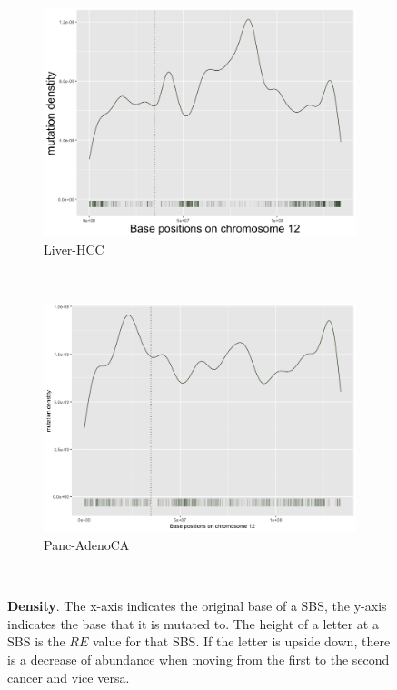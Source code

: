 \begin{figure}
\begin{subfigure}{.5\textwidth}
    \includegraphics[width=\linewidth,height=0.7\textwidth]{graphics/mutdistribution_Liver-HCC.png}
    \caption{Liver-HCC}
    \label{fig:density_liver}
    \end{subfigure}
    ~
    \begin{subfigure}{.5\textwidth}
    
    \includegraphics[width=\linewidth,height=0.7\textwidth]{graphics/mutdistribution_Panc-AdenoCA.png}
    \caption{Panc-AdenoCA}
    \label{fig:density_panc_adenoca}
    \end{subfigure} \\
    
    \caption{\textbf{Density}. The x-axis indicates the original base of a SBS, the y-axis indicates the base that it is mutated to. The height of a letter at a SBS is the $RE$ value for that SBS. If the letter is upside down, there is a decrease of abundance when moving from the first to the second cancer and vice versa.}
    \label{fig:mutation_density}
\end{figure}